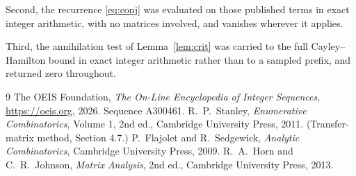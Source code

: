\documentclass[11pt,a4paper]{article}
\theoremstyle{plain}
\theoremstyle{definition}
\begin{document}
Second, the recurrence \eqref{eq:conj} was evaluated on those published terms in exact
integer arithmetic, with no matrices involved, and vanishes wherever it applies.

Third, the annihilation test of Lemma~\ref{lem:crit} was carried to the full
Cayley--Hamilton bound in exact integer arithmetic rather than to a sampled prefix, and
returned zero throughout.

\begin{thebibliography}{9}
 The OEIS Foundation, \emph{The On-Line Encyclopedia of Integer
Sequences}, \url{https://oeis.org}, 2026. Sequence A300461.
 R.~P.~Stanley, \emph{Enumerative Combinatorics}, Volume 1, 2nd ed.,
Cambridge University Press, 2011. (Transfer-matrix method, Section 4.7.)
 P.~Flajolet and R.~Sedgewick, \emph{Analytic Combinatorics}, Cambridge
University Press, 2009.
 R.~A.~Horn and C.~R.~Johnson, \emph{Matrix Analysis}, 2nd ed., Cambridge
University Press, 2013.
\end{thebibliography}
\end{document}
